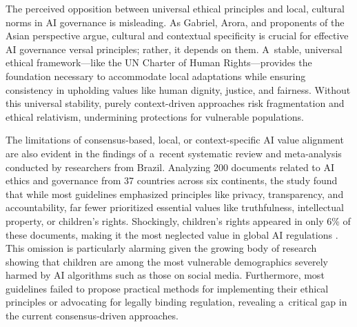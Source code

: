 \documentclass[%
  manuscript=article,
  year=2024,
  volume=77,
  doi=00000.000,
]{zfn}
\begin{document}
The perceived opposition between universal ethical principles and local, cultural norms in AI governance is misleading. As Gabriel, Arora, and proponents of the Asian perspective argue, cultural and contextual specificity is crucial for effective AI governance 
\parencites[][]{gabriel_artificial_2020}[][]{tam_incorporating_2023}[][]{arora_pessimism_2024} %
 versal principles; rather, it depends on them. A~stable, universal ethical framework---like the UN Charter of Human Rights---provides the foundation necessary to accommodate local adaptations while ensuring consistency in upholding values like human dignity, justice, and fairness. Without this universal stability, purely context-driven approaches risk fragmentation and ethical relativism, undermining protections for vulnerable populations.



The limitations of consensus-based, local, or context-specific AI value alignment are also evident in the findings of a~recent systematic review and meta-analysis conducted by researchers from Brazil. Analyzing 200 documents related to AI ethics and governance from 37 countries across six continents, the study found that while most guidelines emphasized principles like privacy, transparency, and accountability, far fewer prioritized essential values like truthfulness, intellectual property, or children's rights. Shockingly, children's rights appeared in only 6\% of these documents, making it the most neglected value in global AI regulations 
\parencite[][]{correa_worldwide_2023}. %
 This omission is particularly alarming given the growing body of research showing that children are among the most vulnerable demographics severely harmed by AI algorithms such as those on social media. Furthermore, most guidelines failed to propose practical methods for implementing their ethical principles or advocating for legally binding regulation, revealing a~critical gap in the current consensus-driven approaches.
\end{document}
